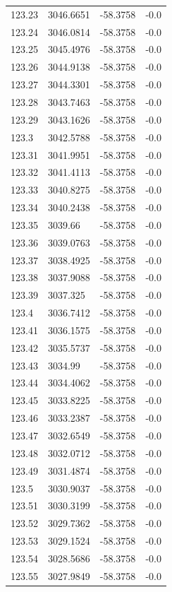 \begin{table}[H]
\begin{tabular}{llll}
123.23 & 3046.6651 & -58.3758 & -0.0 \\
123.24 & 3046.0814 & -58.3758 & -0.0 \\
123.25 & 3045.4976 & -58.3758 & -0.0 \\
123.26 & 3044.9138 & -58.3758 & -0.0 \\
123.27 & 3044.3301 & -58.3758 & -0.0 \\
123.28 & 3043.7463 & -58.3758 & -0.0 \\
123.29 & 3043.1626 & -58.3758 & -0.0 \\
123.3 & 3042.5788 & -58.3758 & -0.0 \\
123.31 & 3041.9951 & -58.3758 & -0.0 \\
123.32 & 3041.4113 & -58.3758 & -0.0 \\
123.33 & 3040.8275 & -58.3758 & -0.0 \\
123.34 & 3040.2438 & -58.3758 & -0.0 \\
123.35 & 3039.66 & -58.3758 & -0.0 \\
123.36 & 3039.0763 & -58.3758 & -0.0 \\
123.37 & 3038.4925 & -58.3758 & -0.0 \\
123.38 & 3037.9088 & -58.3758 & -0.0 \\
123.39 & 3037.325 & -58.3758 & -0.0 \\
123.4 & 3036.7412 & -58.3758 & -0.0 \\
123.41 & 3036.1575 & -58.3758 & -0.0 \\
123.42 & 3035.5737 & -58.3758 & -0.0 \\
123.43 & 3034.99 & -58.3758 & -0.0 \\
123.44 & 3034.4062 & -58.3758 & -0.0 \\
123.45 & 3033.8225 & -58.3758 & -0.0 \\
123.46 & 3033.2387 & -58.3758 & -0.0 \\
123.47 & 3032.6549 & -58.3758 & -0.0 \\
123.48 & 3032.0712 & -58.3758 & -0.0 \\
123.49 & 3031.4874 & -58.3758 & -0.0 \\
123.5 & 3030.9037 & -58.3758 & -0.0 \\
123.51 & 3030.3199 & -58.3758 & -0.0 \\
123.52 & 3029.7362 & -58.3758 & -0.0 \\
123.53 & 3029.1524 & -58.3758 & -0.0 \\
123.54 & 3028.5686 & -58.3758 & -0.0 \\
123.55 & 3027.9849 & -58.3758 & -0.0 \\

\end{tabular}
\end{table}
